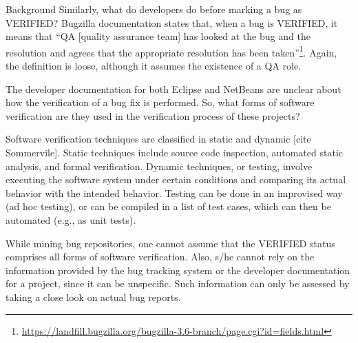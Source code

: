 \begin{section}{Background}
Similarly, what do developers do before marking a bug as VERIFIED? Bugzilla documentation states that, when a bug is VERIFIED, it means that ``QA [quality assurance team] has looked at the bug and the resolution and agrees that the appropriate resolution has been taken''\footnote{\url{https://landfill.bugzilla.org/bugzilla-3.6-branch/page.cgi?id=fields.html}}. Again, the definition is loose, although it assumes the existence of a QA role.

The developer documentation for both Eclipse and NetBeans are unclear about how the verification of a bug fix is performed. So, what forms of  software verification are they used in the verification process of these projects?

Software verification techniques are classified in static and dynamic [cite Sommervile]. Static techniques include source code inspection, automated static analysis, and formal verification. Dynamic techniques, or testing, involve executing the software system under certain conditions and comparing its actual behavior with the intended behavior. Testing can be done in an improvised way (ad hoc testing), or can be compiled in a list of test cases, which can then be automated (e.g., as unit tests).

While mining bug repositories, one cannot assume that the VERIFIED status comprises all forms of software verification. Also, s/he cannot rely on the information provided by the bug tracking system or the developer documentation for a project, since it can be unspecific. Such information can only be assessed by taking a close look on actual bug reports.

% 
% 

\end{section}

